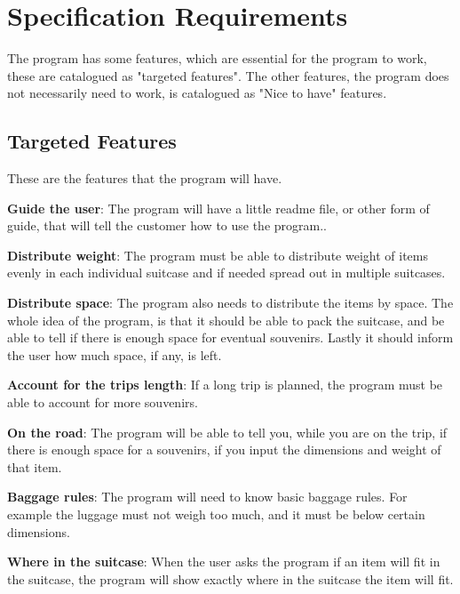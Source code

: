 \section{Specification Requirements}
\label{sec:Spec}
The program has some features, which are essential for the program to work, these are catalogued as "targeted features". The other features, the program does not necessarily need to work, is catalogued as "Nice to have" features.
\newline

\subsection{Targeted Features}
These are the features that the program will have. 

\textbf{Guide the user}:
The program will have a little readme file, or other form of guide, that will tell the customer how to use the program..
\newline

\textbf{Distribute weight}:
The program must be able to distribute weight of items evenly in each individual suitcase and if needed spread out in multiple suitcases.
\newline

\textbf{Distribute space}:
The program also needs to distribute the items by space. The whole idea of the program, is that it should be able to pack the suitcase, and be able to tell if there is enough space for eventual souvenirs. Lastly it should inform the user how much space, if any, is left.
\newline

\textbf{Account for the trips length}:
If a long trip is planned, the program must be able to account for more souvenirs.
\newline

\textbf{On the road}:
The program will be able to tell you, while you are on the trip, if there is enough space for a souvenirs, if you input the dimensions and weight of that item. 
\newline

\textbf{Baggage rules}:
The program will need to know basic baggage rules. For example the luggage must not weigh too much, and it must be below certain dimensions. 
\newline

\textbf{Where in the suitcase}:
When the user asks the program if an item will fit in the suitcase, the program will show exactly where in the suitcase the item will fit.
\newline

